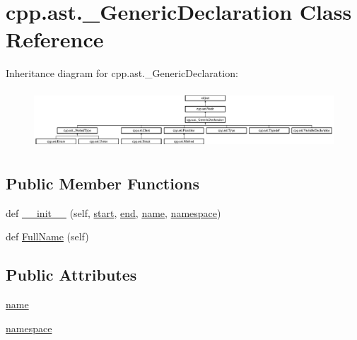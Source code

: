 \hypertarget{classcpp_1_1ast_1_1___generic_declaration}{}\section{cpp.\+ast.\+\_\+\+Generic\+Declaration Class Reference}
\label{classcpp_1_1ast_1_1___generic_declaration}
Inheritance diagram for cpp.\+ast.\+\_\+\+Generic\+Declaration\+:\begin{figure}[H]
\begin{center}
\leavevmode
\includegraphics[height=2.197802cm]{d1/d4e/classcpp_1_1ast_1_1___generic_declaration}
\end{center}
\end{figure}
\subsection*{Public Member Functions}
\begin{DoxyCompactItemize}
\item 
def \mbox{\hyperlink{classcpp_1_1ast_1_1___generic_declaration_afde72751e20708a7802eb7707d23bc3c}{\+\_\+\+\_\+init\+\_\+\+\_\+}} (self, \mbox{\hyperlink{classcpp_1_1ast_1_1_node_a7b2aa97e6a049bb1a93aea48c48f1f44}{start}}, \mbox{\hyperlink{classcpp_1_1ast_1_1_node_a3c5e5246ccf619df28eca02e29d69647}{end}}, \mbox{\hyperlink{classcpp_1_1ast_1_1___generic_declaration_af774f4729dfd78d0538a6782fe8514c1}{name}}, \mbox{\hyperlink{classcpp_1_1ast_1_1___generic_declaration_a8aee3f11b37449d54b42a78e0a689f46}{namespace}})
\item 
def \mbox{\hyperlink{classcpp_1_1ast_1_1___generic_declaration_a1437d31271ea8cda62da22e2ce427a85}{Full\+Name}} (self)
\end{DoxyCompactItemize}
\subsection*{Public Attributes}
\begin{DoxyCompactItemize}
\item 
\mbox{\hyperlink{classcpp_1_1ast_1_1___generic_declaration_af774f4729dfd78d0538a6782fe8514c1}{name}}
\item 
\mbox{\hyperlink{classcpp_1_1ast_1_1___generic_declaration_a8aee3f11b37449d54b42a78e0a689f46}{namespace}}
\end{DoxyCompactItemize}
